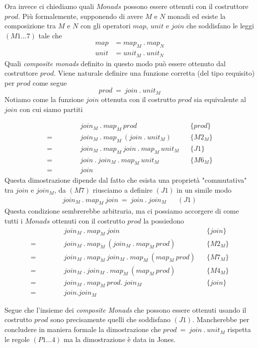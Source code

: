 Ora invece ci chiediamo quali $Monads$ possono essere ottenuti con il costruttore
$prod$.
Più formalemente, supponendo di avere $M$ e $N$ monadi ed esiste la composizione
tra $M$ e $N$ con gli operatori $map$, $unit$ e $join$ che soddisfano le leggi
$(M1\dots7)$ tale che
\begin{align*}
  map &= map_M\ .\ map_N\\
  unit &= unit_M\ .\ unit_N
\end{align*}
Quali \textit{composite monads} definito in questo modo può essere ottenuto dal
costruttore $prod$.
Viene naturale definire una funzione corretta (del tipo requisito) per $prod$ come
segue
\begin{equation*}
  prod\ =\ join\ .\ unit_M
\end{equation*}
Notiamo come la funzione $join$ ottenuta con il costrutto $prod$ sia equivalente
al $join$ con cui siamo partiti
\begin{framed}
  \label{prod_join}
  \begin{align*}
    \quad\qquad
    &\quad join_M\ .\ map_M\ prod && \{prod\}\\
    =&\quad join_M\ .\ map_M\ (join\ .\ unit_M) && \{M2_M\}\\
    =&\quad join_M\ .\ map_M\ join\ .\ map_M\ unit_M && \{J1\}\\
    =&\quad join\ .\ join_M\ .\ map_M\ unit_M && \{M6_M\}\\
    =&\quad join
  \end{align*}
  Questa dimostrazione dipende dal fatto che esista una proprietà "commutativa"
  tra $join$ e $join_M$, da $(M7)$ riusciamo a definire $(J1)$ in un simile modo
  \begin{align*}
    join_M\ .\ map_M\ join\ =\ join\ .\ join_M &&(J1)
  \end{align*}
  Questa condizione sembrerebbe arbitraria, ma ci possiamo accorgere di come
  tutti i $Monads$ ottenuti con il costrutto $prod$ la possiedono
  \begin{align*}
    \quad\qquad
    &\quad join_M\ .\ map_M\ join && \{join\}\\
    =&\quad join_M\ .\ map_M\ (join_M\ .\ map_M\ prod) && \{M2_M\}\\
    =&\quad join_M\ .\ map_M\ join_M\ .\ map_M\ (map_M\ prod) && \{M7_M\}\\
    =&\quad join_M\ .\ join_M\ .\ map_M\ (map_M\ prod) && \{M4_M\}\\
    =&\quad join_M\ .\ map_M\ prod .\ join_M && \{join\}\\
    =&\quad join . join_M
  \end{align*}
\end{framed}
Segue che l'insieme dei \textit{composite Monads} che possono essere ottenuti
usando il costrutto $prod$ sono precisamente quelli che soddisfano $(J1)$.
Mancherebbe per concludere in maniera formale la dimostrazione che $prod\
=\ join\ .\ unit_M$ rispetta le regole $(P1\dots4)$ ma la dimostrazione è data
in Jones\cite{jones0}.

